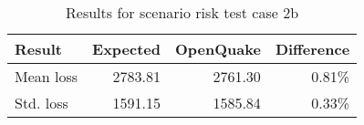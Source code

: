 \begin{table}[htbp]

\centering
\begin{tabular}{ l r r r }

\hline
\rowcolor{anti-flashwhite}
\bf{Result} & \bf{Expected} & \bf{OpenQuake} & \bf{Difference}\\
\hline
Mean loss & 2783.81 & 2761.30 & 0.81\% \\
Std. loss & 1591.15 & 1585.84 & 0.33\% \\
\hline
\end{tabular}

\caption{Results for scenario risk test case 2b}
\label{tab:result-scenario-risk-2b}
\end{table}